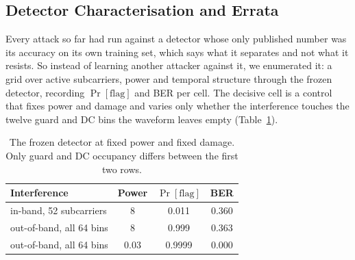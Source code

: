 %
%
%
%

\subsection{Detector Characterisation and Errata}
\label{subsec:exphist:characterisation}
Every attack so far had run against a detector whose only published number was its accuracy on its own
training set, which says what it separates and not what it resists.
So instead of learning another attacker against it, we enumerated it: a grid over active subcarriers,
power and temporal structure through the frozen detector, recording $\Pr[\text{flag}]$ and BER per cell.
The decisive cell is a control that fixes power and damage and varies only whether the interference
touches the twelve guard and DC bins the waveform leaves empty (Table~\ref{tab:inband}).

\begin{table}[!t]
\renewcommand{\arraystretch}{1.3}
\caption{The frozen detector at fixed power and fixed damage. Only guard and DC occupancy differs
between the first two rows.}
\label{tab:inband}
\centering
\begin{tabular}{l c c c}
\hline\hline
\textbf{Interference} & \textbf{Power} & $\Pr[\text{flag}]$ & \textbf{BER} \\
\hline
in-band, 52 subcarriers  & 8    & 0.011  & 0.360 \\
out-of-band, all 64 bins & 8    & 0.999  & 0.363 \\
out-of-band, all 64 bins & 0.03 & 0.9999 & 0.000 \\
\hline\hline
\end{tabular}
\end{table}

